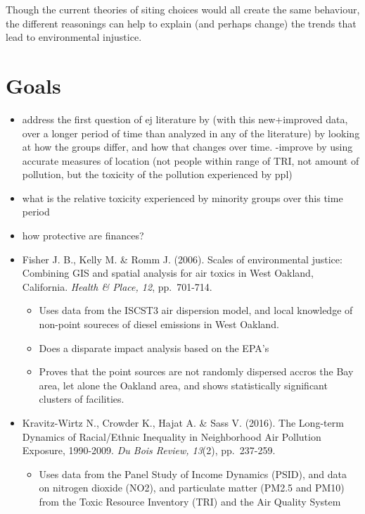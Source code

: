 \documentclass[12pt,twoside]{dukestatscithesis}
\providecommand{\tightlist}{%
  \setlength{\itemsep}{0pt}\setlength{\parskip}{0pt}}
\theoremstyle{definition}
\theoremstyle{definition}
\theoremstyle{definition}
\theoremstyle{remark}
\begin{document}
Though the current theories of siting choices would all create the same
behaviour, the different reasonings can help to explain (and perhaps
change) the trends that lead to environmental injustice.

\section{Goals}\label{goals}
\begin{itemize}
\item
  address the first question of ej literature by (with this new+improved
  data, over a longer period of time than analyzed in any of the
  literature) by looking at how the groups differ, and how that changes
  over time. -improve by using accurate measures of location (not people
  within range of TRI, not amount of pollution, but the toxicity of the
  pollution experienced by ppl)
\item
  what is the relative toxicity experienced by minority groups over this
  time period
\item
  how protective are finances?
\item
  Fisher J. B., Kelly M. \& Romm J. (2006). Scales of environmental
  justice: Combining GIS and spatial analysis for air toxics in West
  Oakland, California. \emph{Health \& Place, 12}, pp.~701-714.
  \begin{itemize}
  \tightlist
  \item
    Uses data from the ISCST3 air dispersion model, and local knowledge
    of non-point soureces of diesel emissions in West Oakland.
  \item
    Does a disparate impact analysis based on the EPA's
  \item
    Proves that the point sources are not randomly dispersed accros the
    Bay area, let alone the Oakland area, and shows statistically
    significant clusters of facilities.
  \end{itemize}
\item
  Kravitz-Wirtz N., Crowder K., Hajat A. \& Sass V. (2016). The
  Long-term Dynamics of Racial/Ethnic Inequality in Neighborhood Air
  Pollution Exposure, 1990-2009. \emph{Du Bois Review, 13}(2),
  pp.~237-259.
  \begin{itemize}
  \tightlist
  \item
    Uses data from the Panel Study of Income Dynamics (PSID), and data
    on nitrogen dioxide (NO2), and particulate matter (PM2.5 and PM10)
    from the Toxic Resource Inventory (TRI) and the Air Quality System

\end{itemize}
\end{itemize}
\end{document}
